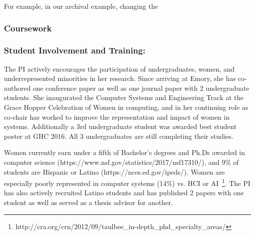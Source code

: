 For example, in our archival example, changing the  

\subsubsection*{Coursework}

\subsubsection*{Student Involvement and Training: }%
The PI actively encourages the participation of undergraduates, women, and
underrepresented minorities in her research.  Since arriving at Emory, she has
co-authored one conference paper as well as one journal paper with 2
undergraduate students.    
She inaugurated the Computer Systems and Engineering Track at the Grace Hopper
Celebration of Women in computing, and in her continuing role as co-chair has
worked to improve the representation and impact of women in systems.  
Additionally a 3rd undergraduate student was awarded best student
poster at GHC 2016.  All 3 undergraduates are still completing their studies.

Women currently earn under a fifth of Bachelor's degrees and Ph.Ds awarded in computer science
(https://www.nsf.gov/statistics/2017/nsf17310/), and 
9\% of students are Hispanic or Latino (https://nces.ed.gov/ipeds/).  Women are
especially poorly represented in computer systems (14\%) vs. HCI or AI~\footnote{http://cra.org/crn/2012/09/taulbee_in-depth_phd_specialty_areas/}.
The PI has also actively recruited Latino students and has published 2 papers
with one student as well as served as a thesis advisor for another.  


